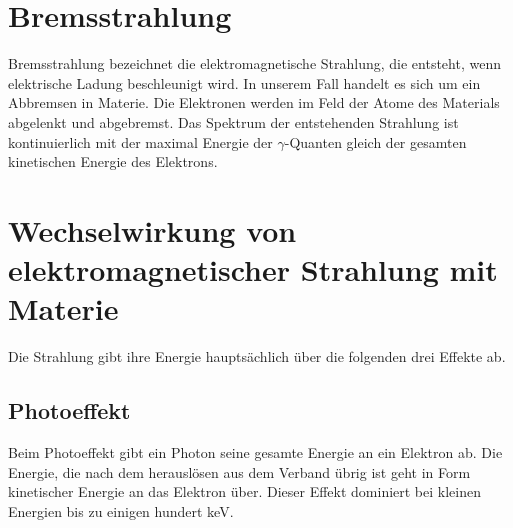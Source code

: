 \documentclass[twoside,colorback,accentcolor=tud4c,11pt]{tudreport}
\begin{document}
\section{Bremsstrahlung}
Bremsstrahlung bezeichnet die elektromagnetische Strahlung, die entsteht, wenn elektrische Ladung beschleunigt wird. In unserem Fall handelt es sich um ein Abbremsen in Materie. Die Elektronen werden im Feld der Atome des Materials abgelenkt und abgebremst. Das Spektrum der entstehenden Strahlung ist kontinuierlich mit der maximal Energie der $ \gamma $-Quanten gleich der gesamten kinetischen Energie des Elektrons.
\section{Wechselwirkung von elektromagnetischer Strahlung mit Materie}
Die Strahlung gibt ihre Energie hauptsächlich über die folgenden drei Effekte ab.
\subsection{Photoeffekt}
Beim Photoeffekt gibt ein Photon seine gesamte Energie an ein Elektron ab. Die Energie, die nach dem herauslösen aus dem Verband übrig ist geht in Form kinetischer Energie an das Elektron über. Dieser Effekt dominiert bei kleinen Energien bis zu einigen hundert keV.
\end{document}
